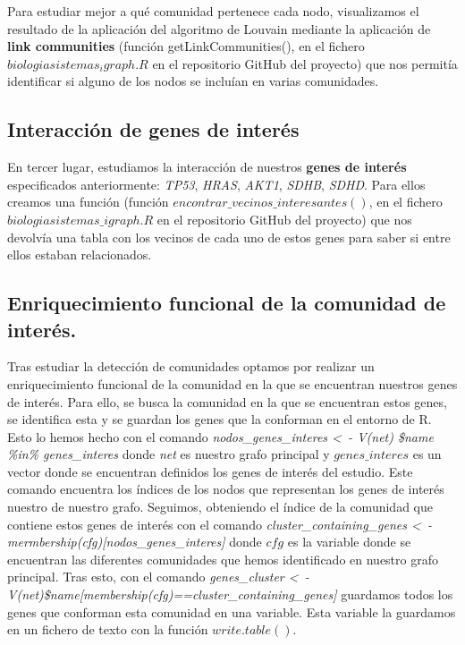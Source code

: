 Para estudiar mejor a qué comunidad pertenece cada nodo, visualizamos el resultado de la aplicación del algoritmo de Louvain mediante la aplicación de \textbf{link communities} (función getLinkCommunities(), en el fichero $biologiasistemas_igraph.R$ en el repositorio GitHub del proyecto) que nos permitía identificar si alguno de los nodos se incluían en varias comunidades. 

\vspace{3pt}
\subsection{Interacción de genes de interés}

En tercer lugar, estudiamos la interacción de nuestros \textbf{genes de interés} especificados anteriormente: \textit{TP53}, \textit{HRAS}, \textit{AKT1}, \textit{SDHB}, \textit{SDHD}. Para ellos creamos una función (función $encontrar\_vecinos\_interesantes()$, en el fichero $biologiasistemas\_igraph.R$ en el repositorio GitHub del proyecto) que nos devolvía una tabla con los vecinos de cada uno de estos genes para saber si entre ellos estaban relacionados.

\vspace{3pt}

\subsection{Enriquecimiento funcional de la comunidad de interés.}

Tras estudiar la detección de comunidades optamos por realizar un enriquecimiento funcional de la comunidad en la que se encuentran nuestros genes de interés. Para ello, se busca la comunidad en la que se encuentran estos genes, se identifica esta y se guardan los genes que la conforman en el entorno de R. Esto lo hemos hecho con el comando \textit{ nodos\_genes\_interes \textless\ - V(net) \$name \%in\% genes\_interes} donde \textit{net} es nuestro grafo principal y $genes\_interes$ es un vector donde se encuentran definidos los genes de interés del estudio. Este comando encuentra los índices de los nodos que representan los genes de interés nuestro de nuestro grafo. Seguimos, obteniendo el índice de la comunidad que contiene estos genes de interés con el comando \textit{ cluster\_containing\_genes \textless\ - mermbership(cfg)[nodos\_genes\_interes]} donde $cfg$ es la variable donde se encuentran las diferentes comunidades que hemos identificado en nuestro grafo principal. Tras esto, con el comando \textit{genes\_cluster \textless\ - V(net)\$name[membership(cfg)==cluster\_containing\_genes]} guardamos todos los genes que conforman esta comunidad en una variable. Esta variable la guardamos en un fichero de texto con la función $write.table()$.

